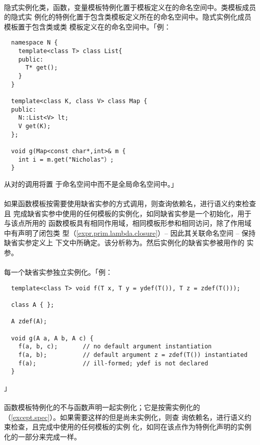 \paragraph{}
隐式实例化类，函数，变量模板特例化置于模板定义在的命名空间中。类模板成员的隐式实
例化的特例化置于包含类模板定义所在的命名空间中。隐式实例化成员模板置于包含类或类
模板定义在的命名空间中。「例：
\begin{lstlisting}
  namespace N {
    template<class T> class List{
    public:
      T* get();
    }
  }

  template<class K, class V> class Map {
  public:
    N::List<V> lt;
    V get(K);
  };

  void g(Map<const char*,int>& m {
    int i = m.get("Nicholas"）;
  }
\end{lstlisting}
从对的调用将置
于命名空间中而不是全局命名空间中。」

\paragraph{}
如果函数模板按需要使用缺省实参的方式调用，则查询依赖名，进行语义约束检查且
完成缺省实参中使用的任何模板的实例化，如同缺省实参是一个初始化，用于与该点所用的
函数模板具有相同作用域，相同模板形参和相同访问，除了作用域中有声明了闭包类
型（\ref{expr.prim.lambda.closure}）-- 因此其关联命名空间 -- 保持缺省实参定义上
下文中所确定。该分析称为。然后实例化的缺省实参被用作的
实参。

\paragraph{}
每一个缺省实参独立实例化。「例：
\begin{lstlisting}
  template<class T> void f(T x, T y = ydef(T()), T z = zdef(T()));

  class A { };

  A zdef(A);

  void g(A a, A b, A c) {
    f(a, b, c);       // no default argument instantiation
    f(a, b);          // default argument z = zdef(T()) instantiated
    f(a);             // ill-formed; ydef is not declared
  }
\end{lstlisting}」

\paragraph{}
函数模板特例化的不与函数声明一起实例化；它是按需实例化的
（\ref{except.spec}）。如果需要这样的但是尚未实例化，则查
询依赖名，进行语义约束检查，且完成中使用的任何模板的实例
化，如同在该点作为特例化声明的实例化的一部分来完成一样。

